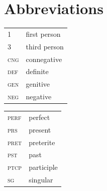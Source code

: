\documentclass[output=paper,colorlinks,citecolor=brown]{langscibook}
\begin{document}
\section*{Abbreviations}
\begin{tabularx}{.45\textwidth}{lQ}
1 & first person \\
3 & third person \\
\scshape cng & connegative \\
\scshape def & definite \\
\scshape gen & genitive \\
\scshape neg & negative \\
\end{tabularx}
\begin{tabularx}{.45\textwidth}{lQ}
\scshape perf & perfect \\
\scshape prs & present \\
\scshape pret & preterite \\
\scshape pst& past \\
\scshape ptcp & participle \\
\scshape sg & singular \\
\end{tabularx}

\sloppy\printbibliography[heading=subbibliography,notkeyword=this]
\end{document}
